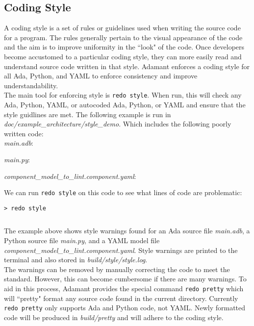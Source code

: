 \subsection{Coding Style} \label{Coding Style}

A coding style is a set of rules or guidelines used when writing the source code for a program. The rules generally pertain to the visual appearance of the code and the aim is to improve uniformity in the ``look" of the code. Once developers become accustomed to a particular coding style, they can more easily read and understand source code written in that style. Adamant enforces a coding style for all Ada, Python, and YAML to enforce consistency and improve understandability. \\

The main tool for enforcing style is \texttt{redo style}. When run, this will check any Ada, Python, YAML, or autocoded Ada, Python, or YAML and ensure that the style guidlines are met. The following example is run in \textit{doc/example\_architecture/style\_demo}. Which includes the following poorly written code: \\

\textit{main.adb}:

\textit{main.py}:

\textit{component\_model\_to\_lint.component.yaml}:

We can run \texttt{redo style} on this code to see what lines of code are problematic:

\vspace{5mm} %
\begin{verbatim}
> redo style
\end{verbatim}
\inputminted{text}{../example_architecture/style_demo/build/style/style.log}
\vspace{5mm} %

The example above shows style warnings found for an Ada source file \textit{main.adb}, a Python source file \textit{main.py}, and a YAML model file \textit{component\_model\_to\_lint.component.yaml}. Style warnings are printed to the terminal and also stored in \textit{build/style/style.log}. \\

The warnings can be removed by manually correcting the code to meet the standard. However, this can become cumbersome if there are many warnings. To aid in this process, Adamant provides the special command \texttt{redo pretty} which will ``pretty" format any source code found in the current directory. Currently \texttt{redo pretty} only supports Ada and Python code, not YAML. Newly formatted code will be produced in \textit{build/pretty} and will adhere to the coding style.

